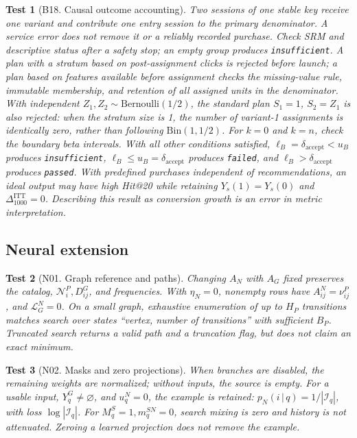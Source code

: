 \documentclass[12pt,a4paper]{article}
\newcommand{\code}[1]{{\ttfamily\small\nolinkurl{#1}}}
\newcommand{\given}{\,\vert\,}
\theoremstyle{plainru}
\newtheorem{testcase}{Test}[section]
\begin{document}
\begin{testcase}[B18. Causal outcome accounting]\label{test:eval-effect}
Two sessions of one stable key receive one variant and contribute one
entry session to the primary denominator. A service error does not remove it
or a reliably recorded purchase. Check SRM and descriptive status after
a safety stop; an empty group produces \code{insufficient}.
A plan with a stratum based on post-assignment clicks is rejected before launch;
a plan based on features available before assignment checks the missing-value rule,
immutable membership, and retention of all assigned units in the denominator.
With independent $Z_1,Z_2\sim\mathrm{Bernoulli}(1/2)$, the standard plan
$S_1=1$, $S_2=Z_1$ is also rejected: when the stratum size is 1, the number of
variant-1 assignments is identically zero, rather than following $\mathrm{Bin}(1,1/2)$.
For $k=0$ and $k=n$, check the boundary beta intervals.
With all other conditions satisfied, $\ell_B=\delta_{\mathrm{accept}}<u_B$
produces \code{insufficient}, $\ell_B\le u_B=\delta_{\mathrm{accept}}$ produces
\code{failed}, and $\ell_B>\delta_{\mathrm{accept}}$ produces \code{passed}.
With predefined purchases independent of recommendations,
an ideal output may have high Hit@20 while retaining
$Y_s(1)=Y_s(0)$ and $\Delta_{1000}^{\mathrm{ITT}}=0$.
Describing this result as conversion growth is an error
in metric interpretation.
\end{testcase}

\subsection{Neural extension}\label{app:tests-neural}

\begin{testcase}[N01. Graph reference and paths]
Changing $A_N$ with $A_G$ fixed preserves the catalog,
$\mathcal N_i^P,D_{ij}^G$, and frequencies. With $\eta_N=0$,
nonempty rows have $A_{ij}^N=\nu_{ij}^P$, and $\mathcal L_G^N=0$.
On a small graph, exhaustive enumeration of up to $H_P$ transitions matches search
over states ``vertex, number of transitions'' with sufficient $B_P$.
Truncated search returns a valid path and a truncation flag,
but does not claim an exact minimum.
\end{testcase}

\begin{testcase}[N02. Masks and zero projections]
When branches are disabled, the remaining weights are normalized; without inputs, the source is empty.
For a usable input, $Y_q^G\ne\varnothing$, and $u_q^N=0$, the example is retained:
$p_N(i\given q)=1/|\mathcal I_q|$, with loss $\log|\mathcal I_q|$.
For $M_q^S=1,m_q^{SN}=0$, search mixing is zero and history is not attenuated.
Zeroing a learned projection does not remove the example.
\end{testcase}
\end{document}
